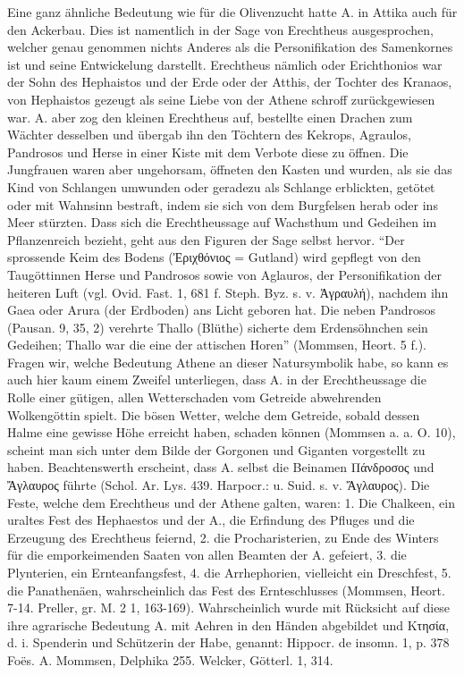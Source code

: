 \documentclass[a4paper, 11pt, oneside]{article}
\begin{document}
Eine ganz ähnliche Bedeutung wie für die Olivenzucht hatte A. in Attika auch für den Ackerbau. Dies ist namentlich in der Sage von Erechtheus ausgesprochen, welcher genau genommen nichts Anderes als die Personifikation des Samenkornes ist und seine Entwickelung darstellt. Erechtheus nämlich oder Erichthonios war der Sohn des Hephaistos und der Erde oder der Atthis, der Tochter des Kranaos, von Hephaistos gezeugt als seine Liebe von der Athene schroff zurückgewiesen war. A. aber zog den kleinen Erechtheus auf, bestellte einen Drachen zum Wächter desselben und übergab ihn den Töchtern des Kekrops, Agraulos, Pandrosos und Herse in einer Kiste mit dem Verbote diese zu öffnen. Die Jungfrauen waren aber ungehorsam, öffneten den Kasten und wurden, als sie das Kind von Schlangen umwunden oder geradezu als Schlange erblickten, getötet oder mit Wahnsinn bestraft, indem sie sich von dem Burgfelsen herab oder ins Meer stürzten. Dass sich die Erechtheussage auf Wachsthum und Gedeihen im Pflanzenreich bezieht, geht aus den Figuren der Sage selbst hervor. "`Der sprossende Keim des Bodens (Ἐριχθόνιος = Gutland) wird gepflegt von den Taugöttinnen Herse und Pandrosos sowie von Aglauros, der Personifikation der heiteren Luft (vgl. Ovid. Fast. 1, 681 f. Steph. Byz. s. v. Ἀγραυλή), nachdem ihn Gaea oder Arura (der Erdboden) ans Licht geboren hat. Die neben Pandrosos (Pausan. 9, 35, 2) verehrte Thallo (Blüthe) sicherte dem Erdensöhnchen sein Gedeihen; Thallo war die eine der attischen Horen"' (Mommsen, Heort. 5 f.). Fragen wir, welche Bedeutung Athene an dieser Natursymbolik habe, so kann es auch hier kaum einem Zweifel unterliegen, dass A. in der Erechtheussage die Rolle einer gütigen, allen Wetterschaden vom Getreide abwehrenden Wolkengöttin spielt. Die bösen Wetter, welche dem Getreide, sobald dessen Halme eine gewisse Höhe erreicht haben, schaden können (Mommsen a. a. O. 10), scheint man sich unter dem Bilde der Gorgonen und Giganten vorgestellt zu haben. Beachtenswerth erscheint, dass A. selbst die Beinamen Πάνδροσος und Ἄγλαυρος führte (Schol. Ar. Lys. 439. Harpocr.: u. Suid. s. v. Ἄγλαυρος). Die Feste, welche dem Erechtheus und der Athene galten, waren: 1. Die Chalkeen, ein uraltes Fest des Hephaestos und der A., die Erfindung des Pfluges und die Erzeugung des Erechtheus feiernd, 2. die Procharisterien, zu Ende des Winters für die emporkeimenden Saaten von allen Beamten der A. gefeiert, 3. die Plynterien, ein Ernteanfangsfest, 4. die Arrhephorien, vielleicht ein Dreschfest, 5. die Panathenäen, wahrscheinlich das Fest des Ernteschlusses (Mommsen, Heort. 7-14. Preller, gr. M. 2 1, 163-169). Wahrscheinlich wurde mit Rücksicht auf diese ihre agrarische Bedeutung A. mit Aehren in den Händen abgebildet und Κτησία, d. i. Spenderin und Schützerin der Habe, genannt: Hippocr. de insomn. 1, p. 378 Foës. A. Mommsen, Delphika 255. Welcker, Götterl. 1, 314.
\end{document}
